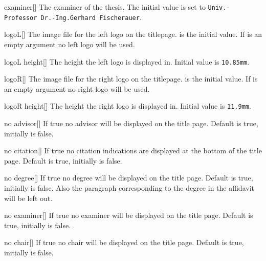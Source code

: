 \begin{describeopt}{examiner}[]
  The examiner of the thesis. The initial value is set to
  \texttt{Univ.-Professor Dr.-Ing.\@ Gerhard Fischerauer}.
\end{describeopt}
\begin{describeopt}{logoL}[]
  The image file for the left logo on the titlepage.
   is the initial value. If  is an
  empty argument no left logo will be used.
\end{describeopt}
\begin{describeopt}{logoL height}[]
  The height the left logo is displayed in. Initial value is \verb|10.85mm|.
\end{describeopt}
\begin{describeopt}{logoR}[]
  The image file for the right logo on the titlepage.
   is the initial value. If  is an
  empty argument no right logo will be used.
\end{describeopt}
\begin{describeopt}{logoR height}[]
  The height the right logo is displayed in. Initial value is \verb|11.9mm|.
\end{describeopt}
\begin{describeopt}{no advisor}[]
  If true no advisor will be displayed on the title page. Default is true,
  initially is false.
\end{describeopt}
\begin{describeopt}{no citation}[]
  If true no citation indications are displayed at the bottom of the title page.
  Default is true, initially is false.
\end{describeopt}
\begin{describeopt}{no degree}[]
  If true no degree will be displayed on the title page. Default is true,
  initially is false. Also the paragraph corresponding to the degree in the
  affidavit will be left out.
\end{describeopt}
\begin{describeopt}{no examiner}[]
  If true no examiner will be displayed on the title page. Default is true,
  initially is false.
\end{describeopt}
\begin{describeopt}{no chair}[]
  If true no chair will be displayed on the title page. Default is true,
  initially is false.
\end{describeopt}
